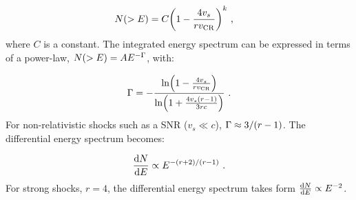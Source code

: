 \begin{equation}
    \begin{aligned}
        N\qty(>E)&=C\qty(1-\frac{4v_s}{rv_\text{CR}})^k \text{ ,}
    \end{aligned}
\end{equation}
\noindent where $C$ is a constant. The integrated energy spectrum can be expressed in terms of a power-law, $N\qty(>E)=AE^{-\Gamma}$, with:

\begin{equation}
    \begin{aligned}
        \Gamma = -\frac{\ln(1-\frac{4v_s}{rv_\text{CR}})}{\ln(1+\frac{4v_s\qty(r-1)}{3rc})} \text{ .}
    \end{aligned}
\end{equation}
\noindent For non-relativistic shocks such as a SNR ($v_s\ll c$),  $\Gamma\approx 3/\qty(r-1)$. The differential energy spectrum becomes:

\begin{equation}
    \begin{aligned}
        \dv{N}{E}\propto E^{-({r+2})/({r-1})} \text{ .}
    \end{aligned}
\end{equation}
\noindent For strong shocks, $r=4$, the differential energy spectrum takes form $\dv{N}{E}\propto E^{-2}$.